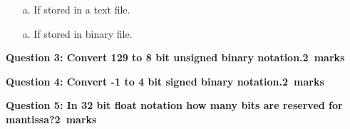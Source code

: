 \documentclass[12pt,a4paper]{article}
\def\Qthree{2}
\def\Qfour{2}
\def\Qfive{2}
\begin{document}
\begin{enumerate}
\item[a.] If stored in a text file.
\begin{figure}[H]
\end{figure}
\item[a.] If stored in binary file.
\begin{figure}[H]
\end{figure}
\end{enumerate}
\noindent\textbf{Question 3: Convert 129 to 8 bit unsigned binary notation.\hfill \Qthree~marks}\\
\begin{figure}[H]
\end{figure}
\noindent\textbf{Question 4: Convert -1 to 4 bit signed binary notation.\hfill \Qfour~marks}\\
\begin{figure}[H]
\end{figure}
\noindent\textbf{Question 5: In 32 bit float notation how many bits are reserved for\\ mantissa?\hfill \Qfive~marks}\\
\begin{figure}[H]
\end{figure}
\end{document}
